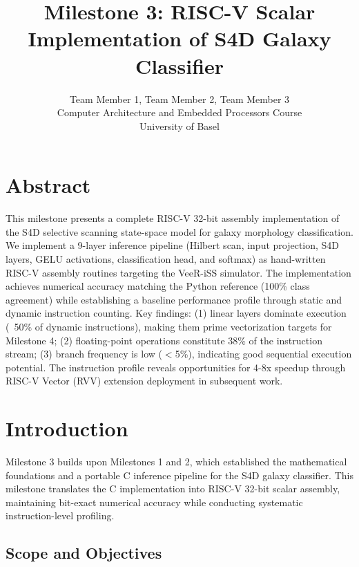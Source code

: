 \documentclass[conference]{IEEEtran}
\title{Milestone 3: RISC-V Scalar Implementation of S4D Galaxy Classifier}
\author{Team Member 1, Team Member 2, Team Member 3 \\
        Computer Architecture and Embedded Processors Course \\
        University of Basel}
\begin{document}
\maketitle

\section{Abstract}

This milestone presents a complete RISC-V 32-bit assembly implementation of the S4D selective scanning state-space model for galaxy morphology classification. We implement a 9-layer inference pipeline (Hilbert scan, input projection, S4D layers, GELU activations, classification head, and softmax) as hand-written RISC-V assembly routines targeting the VeeR-iSS simulator. The implementation achieves numerical accuracy matching the Python reference (100\% class agreement) while establishing a baseline performance profile through static and dynamic instruction counting. Key findings: (1) linear layers dominate execution (~50\% of dynamic instructions), making them prime vectorization targets for Milestone 4; (2) floating-point operations constitute 38\% of the instruction stream; (3) branch frequency is low ($<$5\%), indicating good sequential execution potential. The instruction profile reveals opportunities for 4-8x speedup through RISC-V Vector (RVV) extension deployment in subsequent work.

\section{Introduction}

Milestone 3 builds upon Milestones 1 and 2, which established the mathematical foundations and a portable C inference pipeline for the S4D galaxy classifier. This milestone translates the C implementation into RISC-V 32-bit scalar assembly, maintaining bit-exact numerical accuracy while conducting systematic instruction-level profiling.

\subsection{Scope and Objectives}
\end{document}
